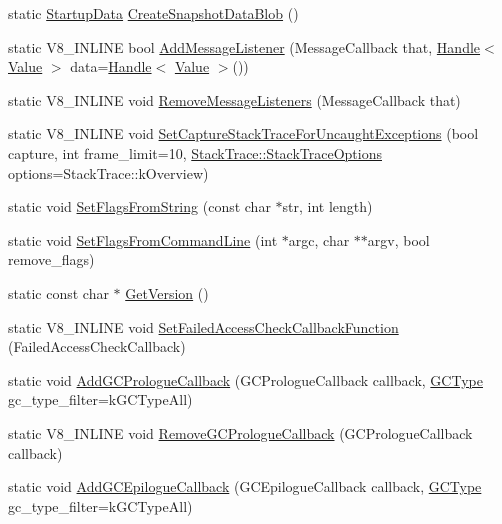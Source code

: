 \begin{DoxyCompactItemize}
\item 
static \hyperlink{classv8_1_1_startup_data}{Startup\+Data} \hyperlink{classv8_1_1_v8_a4ee80a719bba308635a9d4791f7beec5}{Create\+Snapshot\+Data\+Blob} ()
\item 
static V8\+\_\+\+I\+N\+L\+I\+N\+E bool \hyperlink{classv8_1_1_v8_a4e8ca19596400bd4df6a345f66daf937}{Add\+Message\+Listener} (Message\+Callback that, \hyperlink{classv8_1_1_handle}{Handle}$<$ \hyperlink{classv8_1_1_value}{Value} $>$ data=\hyperlink{classv8_1_1_handle}{Handle}$<$ \hyperlink{classv8_1_1_value}{Value} $>$())
\item 
static V8\+\_\+\+I\+N\+L\+I\+N\+E void \hyperlink{classv8_1_1_v8_a103099e00d03c714261e00d75f0d745a}{Remove\+Message\+Listeners} (Message\+Callback that)
\item 
static V8\+\_\+\+I\+N\+L\+I\+N\+E void \hyperlink{classv8_1_1_v8_a6ed3c6cd32b8d225013445b145381d34}{Set\+Capture\+Stack\+Trace\+For\+Uncaught\+Exceptions} (bool capture, int frame\+\_\+limit=10, \hyperlink{classv8_1_1_stack_trace_a9704e4a37949eb8eb8ccddbddf161492}{Stack\+Trace\+::\+Stack\+Trace\+Options} options=Stack\+Trace\+::k\+Overview)
\item 
static void \hyperlink{classv8_1_1_v8_ab263a85e6f97ea79d944bd20bb09a95f}{Set\+Flags\+From\+String} (const char $\ast$str, int length)
\item 
static void \hyperlink{classv8_1_1_v8_a63157ad9284ffad1c0ab62b21aadd08c}{Set\+Flags\+From\+Command\+Line} (int $\ast$argc, char $\ast$$\ast$argv, bool remove\+\_\+flags)
\item 
static const char $\ast$ \hyperlink{classv8_1_1_v8_afcecc0e9e8b5fa17a06a93f7b5a7538d}{Get\+Version} ()
\item 
static V8\+\_\+\+I\+N\+L\+I\+N\+E void \hyperlink{classv8_1_1_v8_affcb65e1fdf849fadc6302655b981bbc}{Set\+Failed\+Access\+Check\+Callback\+Function} (Failed\+Access\+Check\+Callback)
\item 
static void \hyperlink{classv8_1_1_v8_a49c016f17c67f700387f801b2b29b5ab}{Add\+G\+C\+Prologue\+Callback} (G\+C\+Prologue\+Callback callback, \hyperlink{namespacev8_ac109d6f27e0c0f9ef4e98bcf7a806cf2}{G\+C\+Type} gc\+\_\+type\+\_\+filter=k\+G\+C\+Type\+All)
\item 
static V8\+\_\+\+I\+N\+L\+I\+N\+E void \hyperlink{classv8_1_1_v8_ae2b102e4db324cf06a92fd9acdd6b112}{Remove\+G\+C\+Prologue\+Callback} (G\+C\+Prologue\+Callback callback)
\item 
static void \hyperlink{classv8_1_1_v8_a37aadf3536c772eb5bbf67fa7822679a}{Add\+G\+C\+Epilogue\+Callback} (G\+C\+Epilogue\+Callback callback, \hyperlink{namespacev8_ac109d6f27e0c0f9ef4e98bcf7a806cf2}{G\+C\+Type} gc\+\_\+type\+\_\+filter=k\+G\+C\+Type\+All)
$$
\end{DoxyCompactItemize}
